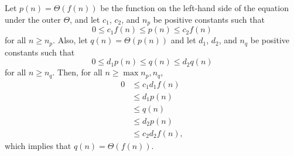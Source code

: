 Let $p(n)=\Theta(f(n))$ be the function on the left-hand side of the equation under the outer $\Theta$, and let $c_1$, $c_2$, and $n_p$ be positive constants such that
\[
    0 \le c_1f(n) \le p(n) \le c_2f(n)
\]
for all $n\ge n_p$.
Also, let $q(n)=\Theta(p(n))$ and let $d_1$, $d_2$, and $n_q$ be positive constants such that
\[
    0 \le d_1p(n) \le q(n) \le d_2q(n)
\]
for all $n\ge n_q$.
Then, for all $n\ge\max{n_p,n_q}$,
\begin{align*}
    0 &\le c_1d_1f(n) \\
    &\le d_1p(n) \\
    &\le q(n) \\
    &\le d_2p(n) \\
    &\le c_2d_2f(n),
\end{align*}
which implies that $q(n)=\Theta(f(n))$.
